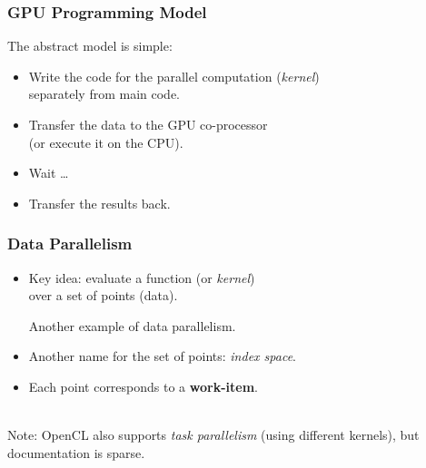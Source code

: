 \begin{frame}
  \frametitle{GPU Programming Model}



  The abstract model is simple:

  \begin{itemize}
    \item Write the code for the parallel computation ({\it kernel}) \\
      \qquad separately from main code.
    \item Transfer the data to the GPU co-processor \\
      \qquad (or execute it on the CPU).
    \item Wait \ldots
    \item Transfer the results back.
  \end{itemize}

\end{frame}

\begin{frame}
  \frametitle{Data Parallelism}


  \begin{itemize}
    \item Key idea: evaluate a function (or {\it kernel}) \\
     \qquad over a set of points (data).\\

\begin{center}
\end{center}

      Another example of data parallelism.\\[1em]
    \item Another name for the set of points: {\it index space}.
    \item Each point corresponds to a {\bf work-item}.
  \end{itemize}~\\[1em]

  Note: OpenCL also supports {\it task parallelism} (using different kernels),
  but documentation is sparse.

\end{frame}

